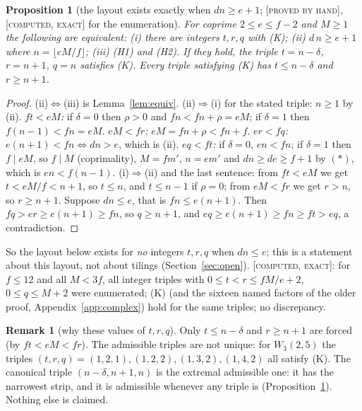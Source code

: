 \documentclass[11pt,reqno]{amsart}
\theoremstyle{plain}
\newtheorem{proposition}[theorem]{Proposition}
\theoremstyle{definition}
\newtheorem{remark}[theorem]{Remark}
\newcommand{\lab}[1]{\textup{[\textsc{#1}]}}
\newcommand{\PH}{\lab{proved by hand}}
\newcommand{\CE}{\lab{computed, exact}}
\begin{document}
\begin{proposition}[the layout exists exactly when $dn\ge e+1$; \PH{}, \CE{} for the enumeration]\label{prop:exact}
For coprime $2\le e\le f-2$ and $M\ge1$ the following are equivalent:
(i) there are integers $t,r,q$ with (K);
(ii) $d\,n\ge e+1$ where $n=\lfloor eM/f\rfloor$;
(iii) (H1) and (H2).
If they hold, the triple $t=n-\delta$, $r=n+1$, $q=n$ satisfies (K). Every triple satisfying (K) has $t\le n-\delta$ and $r\ge n+1$.
\end{proposition}
\begin{proof}
(ii)$\Leftrightarrow$(iii) is Lemma~\ref{lem:equiv}. (ii)$\Rightarrow$(i) for the stated triple: $n\ge1$ by (ii). \emph{$ft<eM$:} if $\delta=0$ then $\rho>0$ and $fn<fn+\rho=eM$; if $\delta=1$ then $f(n-1)<fn=eM$. \emph{$eM<fr$:} $eM=fn+\rho<fn+f$. \emph{$er<fq$:} $e(n+1)<fn\Leftrightarrow dn>e$, which is (ii). \emph{$eq<ft$:} if $\delta=0$, $en<fn$; if $\delta=1$ then $f\mid eM$, so $f\mid M$ (coprimality), $M=fm'$, $n=em'$ and $dn\ge de\ge f+1$ by $(\ast)$, which is $en<f(n-1)$.
(i)$\Rightarrow$(ii) and the last sentence: from $ft<eM$ we get $t<eM/f<n+1$, so $t\le n$, and $t\le n-1$ if $\rho=0$; from $eM<fr$ we get $r>n$, so $r\ge n+1$. Suppose $dn\le e$, that is $fn\le e(n+1)$. Then $fq>er\ge e(n+1)\ge fn$, so $q\ge n+1$, and $eq\ge e(n+1)\ge fn\ge ft>eq$, a contradiction.
\end{proof}
\noindent So the layout below exists for \emph{no} integers $t,r,q$ when $dn\le e$; this is a statement about this layout, not about tilings (Section~\ref{sec:open}). \CE{}: for $f\le12$ and all $M<3f$, all integer triples with $0\le t<r\le fM/e+2$, $0\le q\le M+2$ were enumerated; (K) (and the sixteen named factors of the older proof, Appendix~\ref{app:complex}) hold for the same triples; no discrepancy. \begin{remark}[why these values of $t,r,q$]
Only $t\le n-\delta$ and $r\ge n+1$ are forced (by $ft<eM<fr$). The admissible triples are not unique: for $W_3(2,5)$ the triples $(t,r,q)=(1,2,1),(1,2,2),(1,3,2),(1,4,2)$ all satisfy (K). The canonical triple $(n-\delta,n+1,n)$ is the extremal admissible one: it has the narrowest strip, and it is admissible whenever any triple is (Proposition~\ref{prop:exact}). Nothing else is claimed.
\end{remark}
\end{document}
